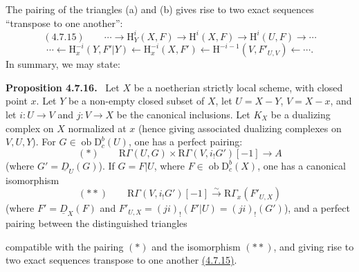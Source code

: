 \documentclass[11pt]{article}
\newenvironment{statement}[1]{\par\medskip\noindent\textbf{#1.}\ }{\par\medskip}
\renewcommand{\H}{\mathrm{H}}
\newcommand{\R}{\mathrm{R}}
\newcommand{\D}{\mathrm{D}}
\newcommand{\ob}{\operatorname{ob}}
\providecommand{\ob}{\operatorname{ob}}
\providecommand{\R}{\mathrm R}
\begin{document}
The pairing of the triangles (a) and (b) gives rise to two exact sequences ``transpose to one another'':
\label{sga5:I:equation:4.7.15}\[
(4.7.15)\qquad \cdots\longrightarrow \H_Y^i(X,F)\longrightarrow\H^i(X,F)\longrightarrow\H^i(U,F)\longrightarrow\cdots
\]
\[
\cdots\longleftarrow \H_x^{-i}(Y,F'|Y)\longleftarrow\H_x^{-i}(X,F')\longleftarrow\H^{-i-1}(V,F'_{U,V})\longleftarrow\cdots.
\]
In summary, we may state:

\label{sga5:I:proposition:4.7.16}\begin{statement}{Proposition 4.7.16}
Let $X$ be a noetherian strictly local scheme, with closed point $x$. Let $Y$ be a non-empty closed subset of $X$, let $U=X-Y$, $V=X-x$, and let $i:U\to V$ and $j:V\to X$ be the canonical inclusions. Let $K_X$ be a dualizing complex on $X$ normalized at $x$ (hence giving associated dualizing complexes on $V,U,Y$). For $G\in\ob\D_c^b(U)$, one has a perfect pairing:
\[
(*)\qquad \R\Gamma(U,G)\times\R\Gamma(V,i_!G')[-1]\longrightarrow A
\]
(where $G'=\underline{D}_U(G)$). If $G=F|U$, where $F\in\ob\D_c^b(X)$, one has a canonical isomorphism
\[
(**)\qquad \R\Gamma(V,i_!G')[-1]\xrightarrow{\sim}\R\Gamma_x(F'_{U,X})
\]
(where $F'=\underline{D}_X(F)$ and $F'_{U,X}=(ji)_!(F'|U)=(ji)_!(G')$), and a perfect pairing between the distinguished triangles
\begin{center}
\end{center}
compatible with the pairing $(*)$ and the isomorphism $(**)$, and giving rise to two exact sequences transpose to one another \hyperref[sga5:I:equation:4.7.15]{(4.7.15)}.
\end{statement}
\end{document}
